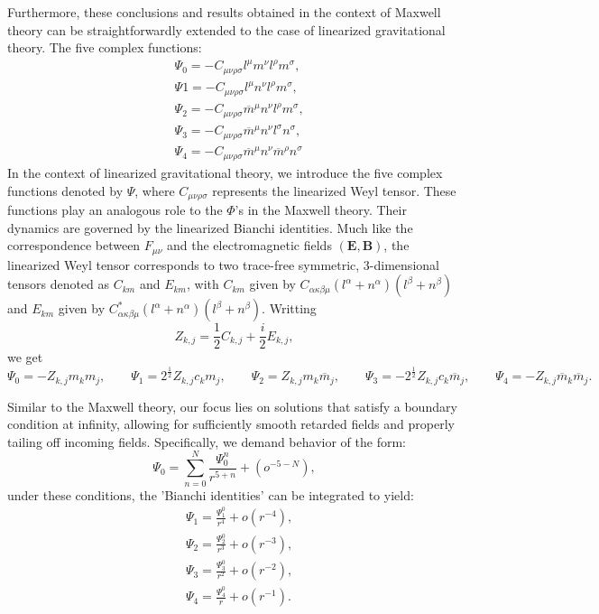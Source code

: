 Furthermore, these conclusions and results obtained in the context of Maxwell theory can be straightforwardly extended to the case of linearized gravitational theory. The five complex functions:
\begin{align}\label{eq:MaxcomplexFuc}
  & \Psi_{0} = -C_{\mu\nu\rho\sigma}l^{\mu}m^{\nu}l^{\rho}m^{\sigma}, \nonumber \\ 
  & \Psi{1} = -C_{\mu\nu\rho\sigma}l^{\mu}n^{\nu}l^{\rho}m^{\sigma}, \nonumber \\ 
  & \Psi_{2} = -C_{\mu\nu\rho\sigma}{\overline{{{m}}}^{\mu}n^{\nu}l^{\rho}m^{\sigma}}, \nonumber \\ 
  & \Psi_{3} = -C_{\mu\nu\rho\sigma}{\overline{{{m}}}^{\mu}n^{\nu}l^{\sigma}}n^{\sigma}, \nonumber \\
  & \Psi_{4} = -C_{\mu\nu\rho\sigma}{\overline{{{m}}}^{\mu}n^{\nu}\overline{{{m}}}^{\rho}}n^{\sigma}
\end{align}
In the context of linearized gravitational theory, we introduce the five complex functions denoted by $\Psi$, where $C_{\mu\nu\rho\sigma}$ represents the linearized Weyl tensor. These functions play an analogous role to the $\Phi$'s in the Maxwell theory. Their dynamics are governed by the linearized Bianchi identities. Much like the correspondence between $F_{\mu \nu}$ and the electromagnetic fields $(\boldsymbol{E}, \boldsymbol{B})$, the linearized Weyl tensor corresponds to two trace-free symmetric, 3-dimensional tensors denoted as $C_{km}$ and $E_{km}$, with $C_{km}$ given by $C_{\alpha \kappa \beta \mu}(l^{\alpha}+n^{\alpha})(l^{\beta}+n^{\beta})$ and $E_{km}$ given by $C_{\alpha \kappa \beta \mu}^{*}(l^{\alpha}+n^{\alpha})(l^{\beta}+n^{\beta})$. Writting $$Z_{k,j} = \frac{1}{2}C_{k,j} + \frac{i}{2}E_{k,j},$$ we get $$\Psi_{0} = - Z_{k,j}m_{k}m_{j}, \qquad \Psi_{1} = 2^{\frac{1}{2}}Z_{k,j}c_{k}m_{j}, \qquad \Psi_{2} = Z_{k,j}m_{k}\overline{m}_{j}, \qquad \Psi_{3} = - 2^{\frac{1}{2}}Z_{k,j}c_{k}\overline{m}_{j}, \qquad \Psi_{4} = -Z_{k,j}\overline{m}_{k}\overline{m}_{j}.$$

Similar to the Maxwell theory, our focus lies on solutions that satisfy a boundary condition at infinity, allowing for sufficiently smooth retarded fields and properly tailing off incoming fields. Specifically, we demand behavior of the form:
\begin{equation}\label{eq:Psi0ansatz}
  \Psi_{0}=\sum_{n=0}^{N}\frac{\Psi_{0}^{n}}{r^{5+n}}+(o^{-5-N}),
\end{equation}
under these conditions, the 'Bianchi identities' can be integrated to yield:
\begin{align}\label{eq:Psiintegrals}
  & \Psi_{1}=\frac{\Psi_{1}^{0}}{r^{4}}+o({r}^{-4}), \nonumber \\ 
  & \Psi_{2}=\frac{\Psi_{2}^{0}}{r^{3}}+o({r}^{-3}), \nonumber \\ 
  & \Psi_{3}=\frac{\Psi_{3}^{0}}{r^{2}}+o({r}^{-2}), \nonumber \\
  & \Psi_{4}=\frac{\Psi_{4}^{0}}{r}+o({r}^{-1}).
\end{align}

